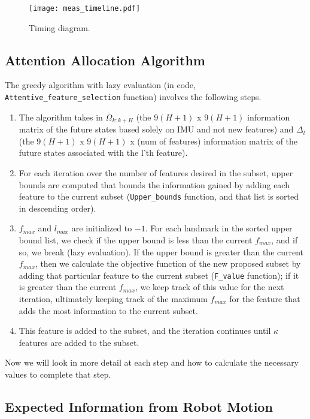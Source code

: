 \begin{figure}
\centering
\texttt{[image: meas\_timeline.pdf]} 
\caption{Timing diagram.}
\label{fig:meas_timeline} 
\end{figure}


\subsection{Attention Allocation Algorithm}\label{sub:attn_algo}

The greedy algorithm with lazy evaluation (in code, \texttt{Attentive\_feature\_selection} function) involves the following steps. 
\begin{enumerate}
    \item The algorithm takes in $\bar{\Omega}_{k:k+H}$ (the $9(H+1)$ x $9(H+1)$ information matrix of the future states based solely on IMU and not new features) and $\Delta_l$ (the $9(H+1)$ x $9(H+1)$ x (num of features) information matrix of the future states associated with the l'th feature).
    \item For each iteration over the number of features desired in the subset, upper bounds are computed that bounds the information gained by adding each feature to the current subset (\texttt{Upper\_bounds} function, and that list is sorted in descending order).
    \item $f_{max}$ and $l_{max}$ are initialized to $-1$. For each landmark in the sorted upper bound list, we check if the upper bound is less than the current $f_{max}$, and if so, we break (lazy evaluation). If the upper bound is greater than the current $f_{max}$, then we calculate the objective function of the new proposed subset by adding that particular feature to the current subset (\texttt{F\_value} function); if it is greater than the current $f_{max}$, we keep track of this value for the next iteration, ultimately keeping track of the maximum $f_{max}$ for the feature that adds the most information to the current subset.
    \item This feature is added to the subset, and the iteration continues until $\kappa$ features are added to the subset.
\end{enumerate}
Now we will look in more detail at each step and how to calculate the necessary values to complete that step.


\subsection{Expected Information from Robot Motion}\label{sub:info_motion}

